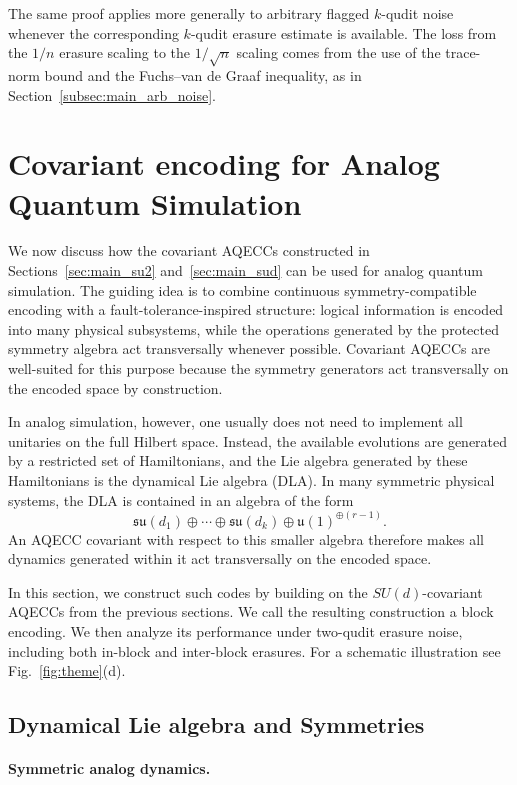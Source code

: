 \documentclass[10pt,twocolumn,superscriptaddress,aps,amsmath,amssymb,citeautoscript,floatfix,prx]{revtex4-2}
\newcounter{alg}
\theoremstyle{plain}
\theoremstyle{plain}
\theoremstyle{plain}
\theoremstyle{plain}
\theoremstyle{plain}
\theoremstyle{plain}
\begin{document}
The same proof applies more generally to arbitrary flagged $k$-qudit noise whenever the corresponding $k$-qudit erasure estimate is available. The loss from the $1/n$ erasure scaling to the $1/\sqrt n$ scaling comes from the use of the trace-norm bound and the Fuchs--van de Graaf inequality, as in Section~\ref{subsec:main_arb_noise}.


\section{Covariant encoding for Analog Quantum Simulation}\label{sec:main_covar_analog}

We now discuss how the covariant AQECCs constructed in Sections~\ref{sec:main_su2} and~\ref{sec:main_sud} can be used for analog quantum simulation. The guiding idea is to combine continuous symmetry-compatible encoding with a fault-tolerance-inspired structure: logical information is encoded into many physical subsystems, while the operations generated by the protected symmetry algebra act transversally whenever possible. Covariant AQECCs are well-suited for this purpose because the symmetry generators act transversally on the encoded space by construction.

In analog simulation, however, one usually does not need to implement all unitaries on the full Hilbert space. Instead, the available evolutions are generated by a restricted set of Hamiltonians, and the Lie algebra generated by these Hamiltonians is the dynamical Lie algebra (DLA). In many symmetric physical systems, the DLA is contained in an algebra of the form
$$
\mathfrak{su}(d_1)
\oplus
\cdots
\oplus
\mathfrak{su}(d_k)
\oplus
\mathfrak{u}(1)^{\oplus(r-1)} .
$$
An AQECC covariant with respect to this smaller algebra therefore makes all dynamics generated within it act transversally on the encoded space.

In this section, we construct such codes by building on the $SU(d)$-covariant AQECCs from the previous sections. We call the resulting construction a block encoding. We then analyze its performance under two-qudit erasure noise, including both in-block and inter-block erasures. For a schematic illustration see Fig.~\ref{fig:theme}(d).

\subsection{Dynamical Lie algebra and Symmetries}\label{subsec:main_DLA}

\paragraph{Symmetric analog dynamics.}
\end{document}
